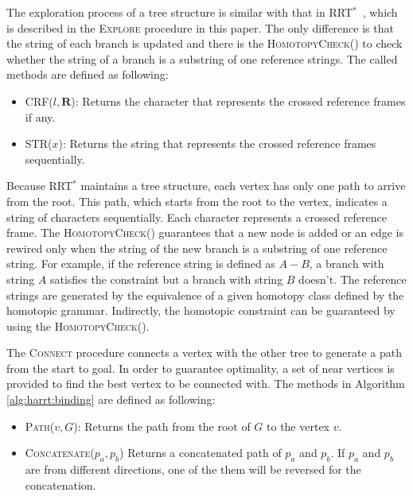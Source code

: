 \documentclass[letterpaper, 10 pt, conference]{ieeeconf}
\begin{document}
The exploration process of a tree structure is similar with that in RRT$^{*}$~\cite{Karaman-RSS-10}, 
which is described in the \textsc{Explore} procedure in this paper.
The only difference is that the string of each branch is updated and there is the \textsc{HomotopyCheck}() to check whether the string of a branch is a substring of one reference strings.
The called methods are defined as following:
\begin{itemize}
	\item \textsc{CRF}($ l, \bm{R} $):
	Returns the character that represents the crossed reference frames if any.
	\item \textsc{STR}($ x $):	
	Returns the string that represents the crossed reference frames sequentially.
\end{itemize}

Because RRT$^{*}$ maintains a tree structure, each vertex has only one path to arrive from the root.
This path, which starts from the root to the vertex, indicates a string of characters sequentially.
Each character represents a crossed reference frame.
The \textsc{HomotopyCheck}() guarantees that a new node is added or an edge is rewired only when the string of the new branch is a substring of one reference string.
For example, if the reference string is defined as $ A-B $, a branch with string $ A $ satisfies the constraint but a branch with string $ B $ doesn't.
The reference strings are generated by the equivalence of a given homotopy class defined by the homotopic grammar.
Indirectly, the homotopic constraint can be guaranteed by using the \textsc{HomotopyCheck}().

The \textsc{Connect} procedure connects a vertex with the other tree to generate a path from the start to goal.
In order to guarantee optimality, a set of near vertices is provided to find the best vertex to be connected with.
The methods in Algorithm \ref{alg:harrt:binding} are defined as following:
\begin{itemize}
	\item \textsc{Path}($ v, G $):	
	Returns the path from the root of $ G $ to the vertex $ v $.
	\item \textsc{Concatenate}{($ p_{a}, p_{b} $)}
	Returns a concatenated path of $ p_{a} $ and $ p_{b} $.
	If $ p_{a} $ and $  p_{b} $ are from different directions, one of the them will be reversed for the concatenation.
\end{itemize}
\end{document}
